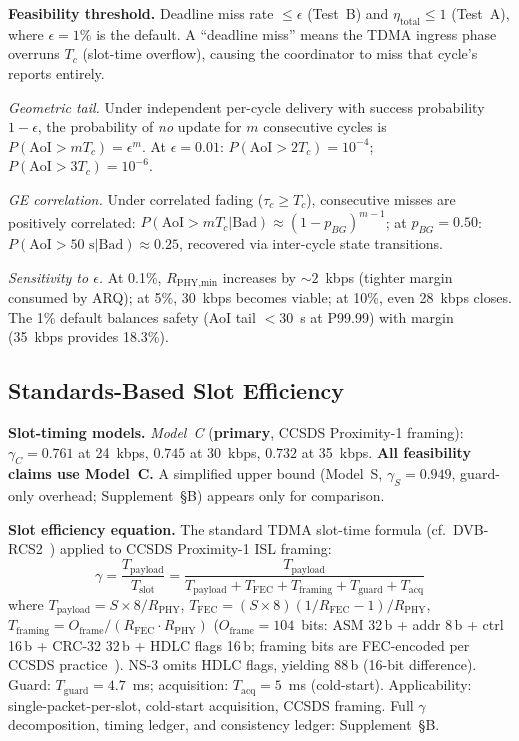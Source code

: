 \documentclass[journal]{IEEEtran}
\begin{document}
\textbf{Feasibility threshold.} Deadline miss rate $\leq \epsilon$ (Test~B) and $\eta_{\text{total}} \leq 1$ (Test~A), where $\epsilon = 1\%$ is the default. A ``deadline miss'' means the TDMA ingress phase overruns $T_c$ (slot-time overflow), causing the coordinator to miss that cycle's reports entirely.

\emph{Geometric tail.} Under independent per-cycle delivery with success probability $1 - \epsilon$, the probability of \emph{no} update for $m$ consecutive cycles is $P(\text{AoI} > m T_c) = \epsilon^m$. At $\epsilon = 0.01$: $P(\text{AoI} > 2T_c) = 10^{-4}$; $P(\text{AoI} > 3T_c) = 10^{-6}$.

\emph{GE correlation.} Under correlated fading ($\tau_c \geq T_c$), consecutive misses are positively correlated: $P(\text{AoI} > m T_c | \text{Bad}) \approx (1 - p_{BG})^{m-1}$; at $p_{BG} = 0.50$: $P(\text{AoI} > 50\text{~s}|\text{Bad}) \approx 0.25$, recovered via inter-cycle state transitions.

\emph{Sensitivity to $\epsilon$.} At 0.1\%, $R_{\text{PHY,min}}$ increases by ${\sim}2$~kbps (tighter margin consumed by ARQ); at 5\%, 30~kbps becomes viable; at 10\%, even 28~kbps closes. The 1\% default balances safety (AoI tail $< 30$~s at P99.99) with margin (35~kbps provides 18.3\%).

\subsection{Standards-Based Slot Efficiency}
\label{sec:packet_derivation}

\textbf{Slot-timing models.} \emph{Model~C} (\textbf{primary}, CCSDS Proximity-1 framing): $\gamma_C = 0.761$ at 24~kbps, $0.745$ at 30~kbps, $0.732$ at 35~kbps. \textbf{All feasibility claims use Model~C.} A simplified upper bound (Model~S, $\gamma_S = 0.949$, guard-only overhead; Supplement~\S B) appears only for comparison.

\textbf{Slot efficiency equation.} The standard TDMA slot-time formula (cf.\ DVB-RCS2~\cite{dvb_rcs2}) applied to CCSDS Proximity-1 ISL framing:
\begin{equation}
    \gamma = \frac{T_{\text{payload}}}{T_{\text{slot}}} = \frac{T_{\text{payload}}}{T_{\text{payload}} + T_{\text{FEC}} + T_{\text{framing}} + T_{\text{guard}} + T_{\text{acq}}}
    \label{eq:gamma_time}
\end{equation}
where $T_{\text{payload}} = S \times 8 / R_{\text{PHY}}$, $T_{\text{FEC}} = (S \times 8)(1/R_{\text{FEC}} - 1) / R_{\text{PHY}}$, $T_{\text{framing}} = O_{\text{frame}} / (R_{\text{FEC}} \cdot R_{\text{PHY}})$ ($O_{\text{frame}} = 104$~bits: ASM 32\,b + addr 8\,b + ctrl 16\,b + CRC-32 32\,b + HDLC flags 16\,b; framing bits are FEC-encoded per CCSDS practice~\cite{ccsds_prox1}). NS-3 omits HDLC flags, yielding 88\,b (16-bit difference). Guard: $T_{\text{guard}} = 4.7$~ms; acquisition: $T_{\text{acq}} = 5$~ms (cold-start). Applicability: single-packet-per-slot, cold-start acquisition, CCSDS framing. Full $\gamma$ decomposition, timing ledger, and consistency ledger: Supplement~\S B.
\end{document}

